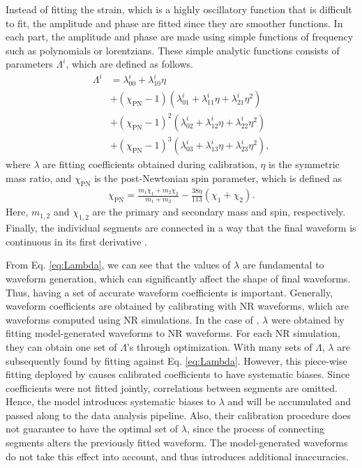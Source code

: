 \documentclass[twocolumn]{aastex631}
\begin{document}
Instead of fitting the strain, which is a highly oscillatory function that is
difficult to fit, the amplitude and phase are fitted since they are smoother
functions. In each part, the amplitude and phase are made using simple functions
of frequency such as polynomials or lorentzians. These simple analytic functions
consists of parameters $\Lambda^i$, which are defined as follows. 
\begin{align} \label{eq:Lambda}
	\Lambda^i&=\lambda_{00}^i+\lambda_{10}^i\eta \nonumber \\
	&+(\chi_{\mathrm{PN}}-1)(\lambda_{01}^i+\lambda_{11}^i\eta+\lambda_{21}^i\eta^2) \nonumber \\ 
	&+(\chi_{\mathrm{PN}}-1)^2(\lambda_{02}^i+\lambda_{12}^i\eta+\lambda_{22}^i\eta^2) \nonumber \\
	&+(\chi_{\mathrm{PN}}-1)^3(\lambda_{03}^i+\lambda_{13}^i\eta+\lambda_{23}^i\eta^2),
\end{align}
where $\lambda$ are fitting coefficients obtained during calibration, $\eta$ is
the symmetric mass ratio, and $\chi_{\mathrm{PN}}$ is the post-Newtonian spin
parameter, which is defined as 
\begin{align}
	\chi_{\mathrm{PN}}=\frac{m_1\chi_1+m_2\chi_2}{m_1+m_2}-\frac{38\eta}{113}(\chi_1+\chi_2).
\end{align}
Here, $m_{1,2}$ and $\chi_{1,2}$ are the primary and secondary mass and spin,
respectively. Finally, the individual segments are connected in a way that the
final waveform is continuous in its first derivative .

From Eq. \ref{eq:Lambda}, we can see that the values of $\lambda$ are
fundamental to waveform generation, which can significantly affect the shape of
final waveforms. Thus, having a set of accurate waveform coefficients is
important. Generally, waveform coefficients are obtained by calibrating with NR
waveforms, which are waveforms computed using NR simulations. In the case of
\citep{khan2016frequency}, $\lambda$ were obtained by fitting model-generated
waveforms to NR waveforms. For each NR simulation, they can obtain one set of
$\Lambda$'s through optimization. With many sets of $\Lambda$, $\lambda$ are
subsequently found by fitting against Eq. \ref{eq:Lambda}. However, this
piece-wise fitting deployed by \citep{khan2016frequency} causes calibrated
coefficients to have systematic biases. Since coefficients were not fitted
jointly, correlations between segments are omitted. Hence, the model introduces
systematic biases to $\lambda$ and will be accumulated and passed along to the
data analysis pipeline. Also, their calibration procedure does not guarantee to
have the optimal set of $\lambda$, since the process of connecting segments
alters the previously fitted waveform. The model-generated waveforms do not take
this effect into account, and thus introduces additional inaccuracies. 
\end{document}
